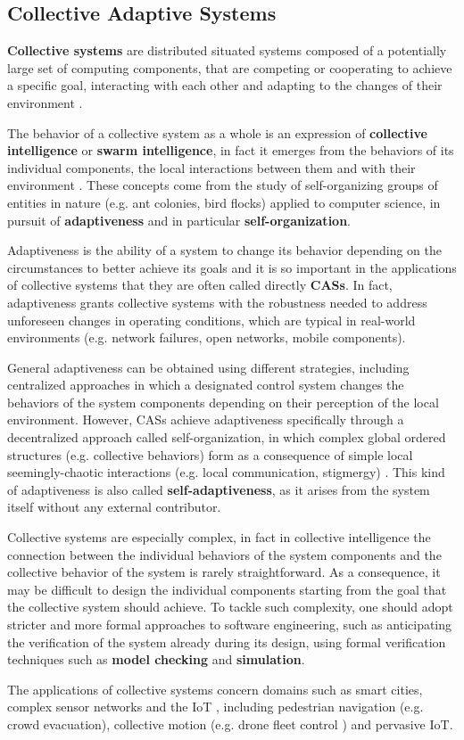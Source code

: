 \subsection{Collective Adaptive Systems}

\textbf{Collective systems} are distributed situated systems composed of a
potentially large set of computing components, that are competing or cooperating
to achieve a specific goal, interacting with each other and adapting to the
changes of their environment \cite{CAS}.

The behavior of a collective system as a whole is an expression of
\textbf{collective intelligence} or \textbf{swarm intelligence}, in fact it
emerges from the behaviors of its individual components, the local interactions
between them and with their environment \cite{SwarmIntelligence}. These
concepts come from the study of self-organizing groups of entities in nature
(e.g. ant colonies, bird flocks) applied to computer science, in pursuit of
\textbf{adaptiveness} and in particular \textbf{self-organization}.

Adaptiveness is the ability of a system to change its behavior depending on the
circumstances to better achieve its goals and it is so important in the
applications of collective systems that they are often called directly
\textbf{\acp{CAS}}. In fact, adaptiveness grants collective systems with the
robustness needed to address unforeseen changes in operating conditions, which
are typical in real-world environments (e.g. network failures, open networks,
mobile components).

General adaptiveness can be obtained using different strategies, including
centralized approaches in which a designated control system changes the
behaviors of the system components depending on their perception of the local
environment. However, \acp{CAS} achieve adaptiveness specifically through a
decentralized approach called self-organization, in which complex global
ordered structures (e.g. collective behaviors) form as a consequence of simple
local seemingly-chaotic interactions (e.g. local communication, stigmergy)
\cite{SelfOrganization}. This kind of adaptiveness is also called
\textbf{self-adaptiveness}, as it arises from the system itself without any
external contributor.

Collective systems are especially complex, in fact in collective intelligence
the connection between the individual behaviors of the system components and
the collective behavior of the system is rarely straightforward. As a
consequence, it may be difficult to design the individual components starting
from the goal that the collective system should achieve. To tackle such
complexity, one should adopt stricter and more formal approaches to software
engineering, such as anticipating the verification of the system already during
its design, using formal verification techniques such as \textbf{model
checking} and \textbf{simulation}.

The applications of collective systems concern domains such as smart cities,
complex sensor networks and the \ac{IoT} \cite{CAS-AggregateComputingBlocks},
including pedestrian navigation (e.g. crowd evacuation), collective motion
(e.g. drone fleet control \cite{CollectiveMotion-Quadcopter}) and pervasive
\ac{IoT}.